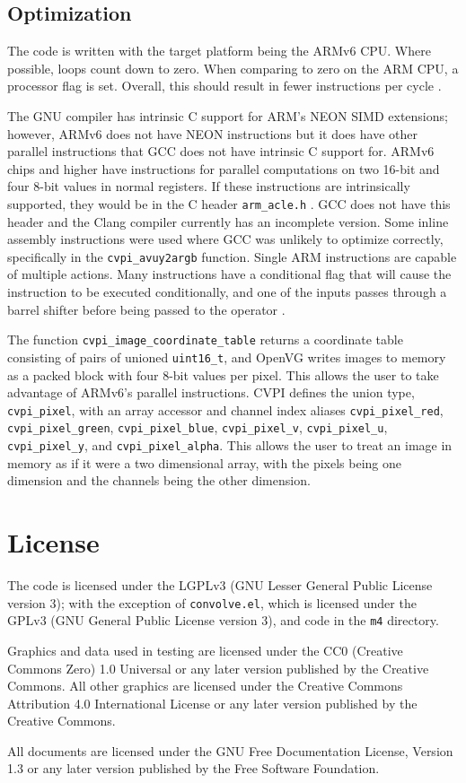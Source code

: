 \documentclass[12pt]{report}
\begin{document}
\section{Optimization}
\label{sec-11-3}
The code is written with the target platform being the ARMv6
CPU. Where possible, loops count down to zero. When comparing to
zero on the ARM CPU, a processor flag is set. Overall, this should
result in fewer instructions per cycle \cite[p.~180]{Langbridge}.

The GNU compiler has intrinsic C support for ARM's NEON SIMD
extensions; however, ARMv6 does not have NEON instructions but it
does have other parallel instructions that GCC does not have
intrinsic C support for. ARMv6 chips and higher have instructions
for parallel computations on two 16-bit and four 8-bit values in
normal registers. If these instructions are intrinsically supported,
they would be in the C header {\tt arm\_acle.h} \cite[p.~14]{IHI0053B}. GCC
does not have this header and the Clang compiler currently has an
incomplete version. Some inline assembly instructions were used
where GCC was unlikely to optimize correctly, specifically in the
{\tt cvpi\_avuy2argb} function. Single ARM instructions are capable
of multiple actions. Many instructions have a conditional flag that
will cause the instruction to be executed conditionally, and one of
the inputs passes through a barrel shifter before being passed to
the operator \cite[p.~37]{Langbridge}.

The function {\tt cvpi\_image\_coordinate\_table} returns a coordinate
table consisting of pairs of unioned {\tt uint16\_t}, and OpenVG writes
images to memory as a packed block with four 8-bit values per
pixel. This allows the user to take advantage of ARMv6's parallel
instructions. CVPI defines the union type, {\tt cvpi\_pixel}, with an
array accessor and channel index aliases {\tt cvpi\_pixel\_red},
{\tt cvpi\_pixel\_green}, {\tt cvpi\_pixel\_blue}, {\tt cvpi\_pixel\_v},
{\tt cvpi\_pixel\_u}, {\tt cvpi\_pixel\_y}, and {\tt cvpi\_pixel\_alpha}. This allows
the user to treat an image in memory as if it were a two
dimensional array, with the pixels being one dimension and the
channels being the other dimension.

\chapter{License}
\label{sec-12}
The code is licensed under the LGPLv3 (GNU Lesser General Public
License version 3); with the exception of {\tt convolve.el}, which is
licensed under the GPLv3 (GNU General Public License
version 3), and code in the {\tt m4} directory.

Graphics and data used in testing are licensed under the CC0 (Creative
Commons Zero) 1.0 Universal or any later version published by the
Creative Commons. All other graphics are licensed under the Creative
Commons Attribution 4.0 International License or any later version
published by the Creative Commons.

All documents are licensed under the GNU Free Documentation License,
Version 1.3 or any later version published by the Free Software
Foundation.



\end{document}
